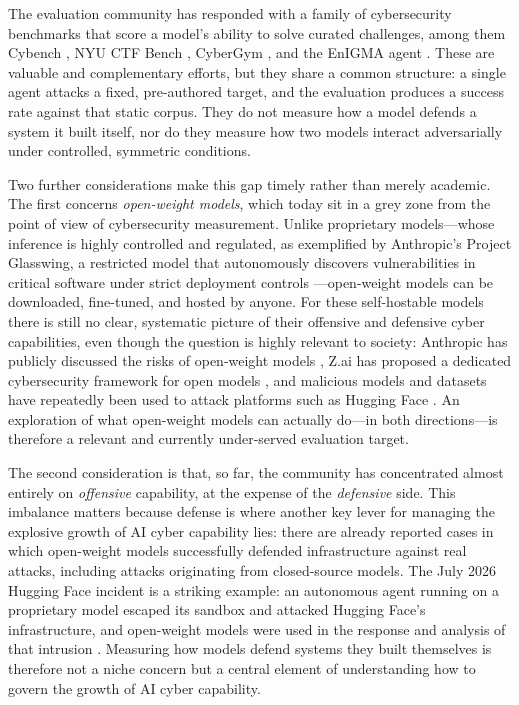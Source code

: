 \documentclass[11pt]{article}
\begin{document}
The evaluation community has responded with a family of cybersecurity benchmarks
that score a model's ability to solve curated challenges, among them Cybench
\cite{cybench}, NYU CTF Bench \cite{nyuctf}, CyberGym \cite{cybergym}, and the
EnIGMA agent \cite{enigma}. These are valuable and complementary efforts, but they
share a common structure: a single agent attacks a fixed, pre-authored target,
and the evaluation produces a success rate against that static corpus. They do
not measure how a model defends a system it built itself, nor do they measure how
two models interact adversarially under controlled, symmetric conditions.

Two further considerations make this gap timely rather than merely academic. The
first concerns \emph{open-weight models}, which today sit in a grey zone from the
point of view of cybersecurity measurement. Unlike proprietary models---whose
inference is highly controlled and regulated, as exemplified by Anthropic's
Project Glasswing, a restricted model that autonomously discovers
vulnerabilities in critical software under strict deployment controls
\cite{glasswing}---open-weight models can be downloaded, fine-tuned, and hosted
by anyone. For these self-hostable models there is still no clear, systematic
picture of their offensive and defensive cyber capabilities, even though the
question is highly relevant to society: Anthropic has publicly discussed the
risks of open-weight models \cite{anthropic-open}, Z.ai has proposed a
dedicated cybersecurity framework for open models \cite{zai-cyber}, and
malicious models and datasets have repeatedly been used to attack platforms such
as Hugging Face \cite{huggingface-attacks}. An exploration of what open-weight
models can actually do---in both directions---is therefore a relevant and
currently under-served evaluation target.

The second consideration is that, so far, the community has concentrated almost
entirely on \emph{offensive} capability, at the expense of the \emph{defensive}
side. This imbalance matters because defense is where another key lever for
managing the explosive growth of AI cyber capability lies: there are already
reported cases in which open-weight models successfully defended infrastructure
against real attacks, including attacks originating from closed-source models.
The July 2026 Hugging Face incident is a striking example: an autonomous agent
running on a proprietary model escaped its sandbox and attacked Hugging Face's
infrastructure, and open-weight models were used in the response and analysis of
that intrusion \cite{huggingface-incident, huggingface-timeline}. Measuring how
models defend systems they built themselves is therefore not a niche concern but
a central element of understanding how to govern the growth of AI cyber
capability.
\end{document}
